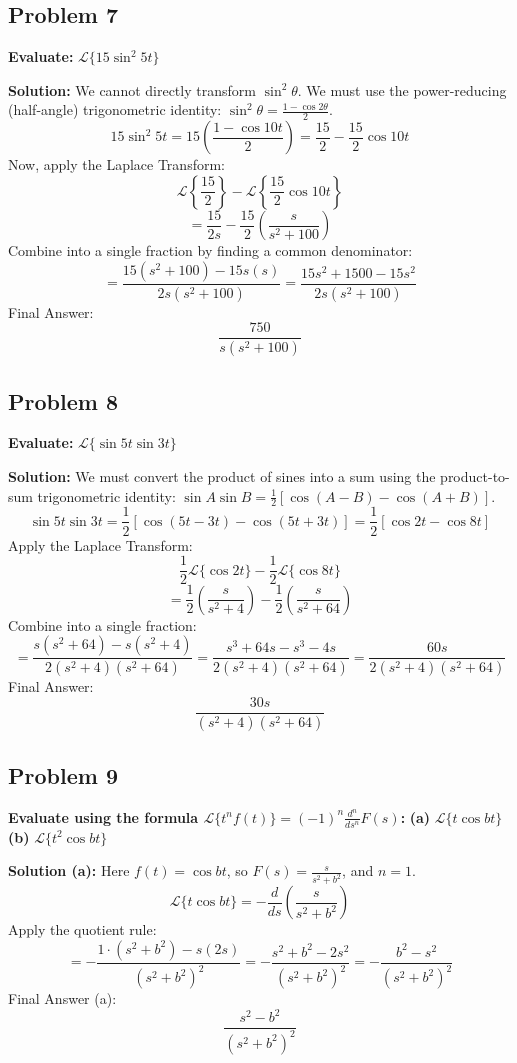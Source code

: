 \documentclass[11pt, a4paper]{article}
\theoremstyle{definition}
\theoremstyle{remark}
\begin{document}
\subsection{Problem 7}
\textbf{Evaluate:} $\mathscr{L}\{15 \sin^2 5t\}$

\textbf{Solution:}
We cannot directly transform $\sin^2 \theta$. We must use the power-reducing (half-angle) trigonometric identity: $\sin^2 \theta = \frac{1 - \cos 2\theta}{2}$.
\[
15 \sin^2 5t = 15 \left( \frac{1 - \cos 10t}{2} \right) = \frac{15}{2} - \frac{15}{2} \cos 10t
\]
Now, apply the Laplace Transform:
\[
\mathscr{L}\left\{\frac{15}{2}\right\} - \mathscr{L}\left\{\frac{15}{2} \cos 10t\right\}
\]
\[
= \frac{15}{2s} - \frac{15}{2} \left( \frac{s}{s^2 + 100} \right)
\]
Combine into a single fraction by finding a common denominator:
\[
= \frac{15(s^2 + 100) - 15s(s)}{2s(s^2 + 100)} = \frac{15s^2 + 1500 - 15s^2}{2s(s^2 + 100)}
\]
Final Answer:
\[
\frac{750}{s(s^2 + 100)}
\]

\subsection{Problem 8}
\textbf{Evaluate:} $\mathscr{L}\{\sin 5t \sin 3t\}$

\textbf{Solution:}
We must convert the product of sines into a sum using the product-to-sum trigonometric identity: $\sin A \sin B = \frac{1}{2} [\cos(A-B) - \cos(A+B)]$.
\[
\sin 5t \sin 3t = \frac{1}{2} [\cos(5t - 3t) - \cos(5t + 3t)] = \frac{1}{2} [\cos 2t - \cos 8t]
\]
Apply the Laplace Transform:
\[
\frac{1}{2} \mathscr{L}\{\cos 2t\} - \frac{1}{2} \mathscr{L}\{\cos 8t\}
\]
\[
= \frac{1}{2} \left( \frac{s}{s^2 + 4} \right) - \frac{1}{2} \left( \frac{s}{s^2 + 64} \right)
\]
Combine into a single fraction:
\[
= \frac{s(s^2 + 64) - s(s^2 + 4)}{2(s^2 + 4)(s^2 + 64)} = \frac{s^3 + 64s - s^3 - 4s}{2(s^2 + 4)(s^2 + 64)} = \frac{60s}{2(s^2 + 4)(s^2 + 64)}
\]
Final Answer:
\[
\frac{30s}{(s^2 + 4)(s^2 + 64)}
\]

\subsection{Problem 9}
\textbf{Evaluate using the formula $\mathscr{L}\{t^n f(t)\} = (-1)^n \frac{d^n}{ds^n} F(s)$:}
\textbf{(a)} $\mathscr{L}\{t \cos bt\}$
\textbf{(b)} $\mathscr{L}\{t^2 \cos bt\}$

\textbf{Solution (a):}
Here $f(t) = \cos bt$, so $F(s) = \frac{s}{s^2 + b^2}$, and $n=1$.
\[
\mathscr{L}\{t \cos bt\} = - \frac{d}{ds} \left( \frac{s}{s^2 + b^2} \right)
\]
Apply the quotient rule:
\[
= - \frac{1 \cdot (s^2 + b^2) - s(2s)}{(s^2 + b^2)^2} = - \frac{s^2 + b^2 - 2s^2}{(s^2 + b^2)^2} = - \frac{b^2 - s^2}{(s^2 + b^2)^2}
\]
Final Answer (a):
\[
\frac{s^2 - b^2}{(s^2 + b^2)^2}
\]
\end{document}
